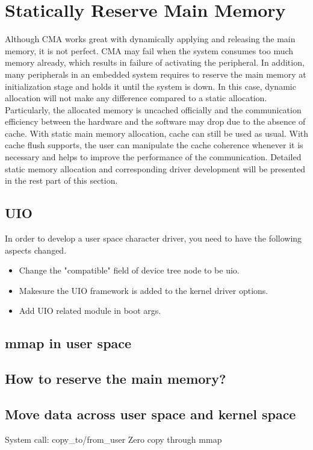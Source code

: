 \documentclass[12pt]{article} %
\begin{document}
\section{Statically Reserve Main Memory}
Although CMA works great with dynamically applying and releasing 
the main memory, it is not perfect. CMA may fail when the system consumes too much memory 
already, which results in failure of activating the peripheral. In addition, many peripherals in 
an embedded system requires to reserve the main memory at initialization stage and holds it until 
the system is down. In this case, dynamic allocation will not make any difference compared to a static 
allocation. Particularly, the allocated memory is uncached officially and the communication efficiency 
between the hardware and the software may drop due to the absence of cache. With static main memory 
allocation, cache can still be used as usual. With cache flush supports, the user can manipulate the 
cache coherence whenever it is necessary and helps to improve the performance of the communication.
Detailed static memory allocation and corresponding driver development will be presented in the rest 
part of this section.

\subsection{UIO}
In order to develop a user space character driver, you need to have the following aspects changed.
\begin{itemize}
    \item Change the "compatible" field of device tree node to be uio.
    \item Makesure the UIO framework is added to the kernel driver options.
    \item Add UIO related module in boot args.
\end{itemize}

\subsection{mmap in user space}

\subsection{How to reserve the main memory?}

\subsection{Move data across user space and kernel space}
System call: copy\_to/from\_user
Zero copy through mmap
\end{document}
